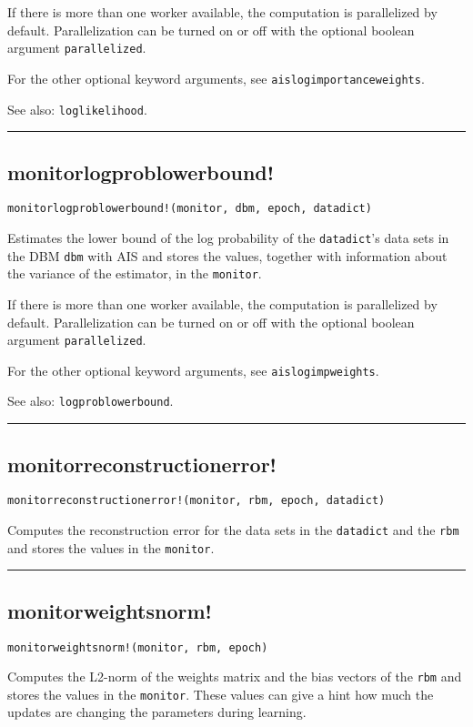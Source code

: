If there is more than one worker available, the computation is parallelized by default. Parallelization can be turned on or off with the optional boolean argument \texttt{parallelized}.

For the other optional keyword arguments, see \texttt{aislogimportanceweights}.

See also: \texttt{loglikelihood}.

\noindent\rule{\textwidth}{1pt}
\subsection*{monitorlogproblowerbound!}  \label{bms_monitorlogproblowerbound!}
\begin{verbatim}
monitorlogproblowerbound!(monitor, dbm, epoch, datadict)
\end{verbatim}
Estimates the lower bound of the log probability of the \texttt{datadict}'s data sets in the DBM \texttt{dbm} with AIS and stores the values, together with information about the variance of the estimator, in the \texttt{monitor}.

If there is more than one worker available, the computation is parallelized by default. Parallelization can be turned on or off with the optional boolean argument \texttt{parallelized}.

For the other optional keyword arguments, see \texttt{aislogimpweights}.

See also: \texttt{logproblowerbound}.

\noindent\rule{\textwidth}{1pt}
\subsection*{monitorreconstructionerror!}  \label{bms_monitorreconstructionerror!}
\begin{verbatim}
monitorreconstructionerror!(monitor, rbm, epoch, datadict)
\end{verbatim}
Computes the reconstruction error for the data sets in the \texttt{datadict} and the \texttt{rbm} and stores the values in the \texttt{monitor}.

\noindent\rule{\textwidth}{1pt}
\subsection*{monitorweightsnorm!}  \label{bms_monitorweightsnorm!}
\begin{verbatim}
monitorweightsnorm!(monitor, rbm, epoch)
\end{verbatim}
Computes the L2-norm of the weights matrix and the bias vectors of the \texttt{rbm} and stores the values in the \texttt{monitor}. These values can give a hint how much the updates are changing the parameters during learning.

